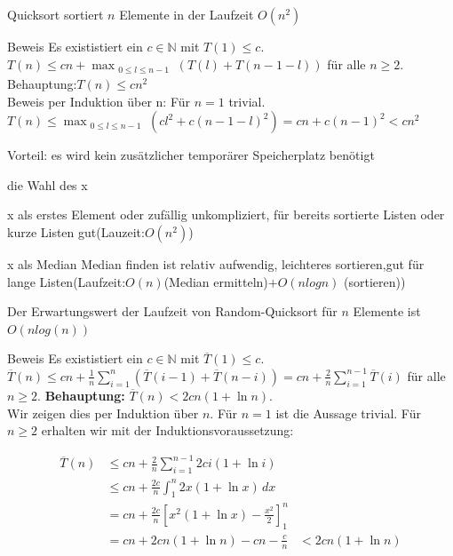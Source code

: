 \documentclass{beamer}
\begin{document}
\begin{frame}{Quicksort sortiert $n$ Elemente in der Laufzeit $O(n^2)$}
\begin{block}{Beweis}
Es exististiert ein $c\in \mathbb{N}$ mit $T(1) \leq c$.
$T(n)\leq cn + \max_{\substack{0\leq l \leq n-1}}(T(l)+T(n-1-l))
 $ für alle $n\geq 2$.
 Behauptung:$T(n)\leq cn^2 $\\
 Beweis per Induktion über n: Für $n=1$ trivial.\\
 $T(n)\leq \max_{\substack{0\leq l \leq n-1}}(cl^2+c(n-1-l)^2) = cn+ c(n-1)^2 < cn^2$
\end{block}
\begin{block}{Vorteil: es wird kein zusätzlicher temporärer Speicherplatz benötigt}
\end{block}
\end{frame}
\begin{frame}{die Wahl des x}
\begin{block}{x als erstes Element oder zufällig}
unkompliziert, für bereits sortierte Listen oder kurze Listen gut(Lauzeit:$O(n^2)$) 
\end{block}
\begin{block}{x als Median}
Median finden ist relativ aufwendig, leichteres sortieren,gut für lange Listen(Laufzeit:$O(n)$(Median ermitteln)$+O(nlog n)$ (sortieren)) 
\end{block}
\end{frame}
\begin{frame}{Der Erwartungswert der Laufzeit von Random-Quicksort für $n$ Elemente ist $O(n log(n))$}
\begin{block}{Beweis}
Es exististiert ein $c\in \mathbb{N}$ mit $\overline{T}(1) \leq c$.
$\overline{T}(n)\leq cn + \frac{1}{n} \sum_{i=1}^{n} (\overline{T}(i-1) + \overline{T}(n-i)) = cn + \frac{2}{n} \sum_{i=1}^{n-1} \overline{T}(i)
 $ für alle $n\geq 2$.
 \textbf{Behauptung:} $\overline{T}(n) < 2cn(1 + \ln n)$. \\
Wir zeigen dies per Induktion über $n$. Für $n = 1$ ist die Aussage trivial. Für $n \geq 2$ erhalten wir mit der Induktionsvoraussetzung:

\begin{align*}
\overline{T}(n) &\leq cn + \frac{2}{n} \sum_{i=1}^{n-1} 2ci(1 + \ln i) \\
&\leq cn + \frac{2c}{n} \int_{1}^{n} 2x(1 + \ln x) \, dx \\
&= cn + \frac{2c}{n} \left[ x^2(1 + \ln x) - \frac{x^2}{2} \right]_{1}^{n} \\
&= cn + 2cn(1 + \ln n) - cn - \frac{c}{n} 
&< 2cn(1 + \ln n)
\end{align*}
\end{block}
\end{frame}
\end{document}
